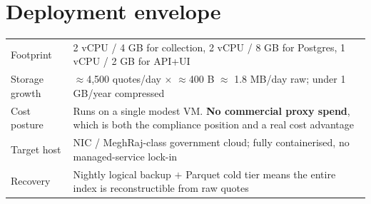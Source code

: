 \section{Deployment envelope}

\begin{center}
\footnotesize
\begin{tabularx}{\textwidth}{@{}L{3.4cm} X@{}}
\toprule
{} &  \\
\midrule
Footprint & 2 vCPU / 4 GB for collection, 2 vCPU / 8 GB for Postgres, 1 vCPU / 2 GB for API+UI \\
Storage growth & $\approx$4{,}500 quotes/day $\times$ $\approx$400 B $\approx$ 1.8 MB/day raw; under 1 GB/year compressed \\
Cost posture & Runs on a single modest VM. \textbf{No commercial proxy spend}, which is both the compliance position and a real cost advantage \\
Target host & NIC / MeghRaj-class government cloud; fully containerised, no managed-service lock-in \\
Recovery & Nightly logical backup $+$ Parquet cold tier means the entire index is reconstructible from raw quotes \\
\bottomrule
\end{tabularx}
\end{center}
